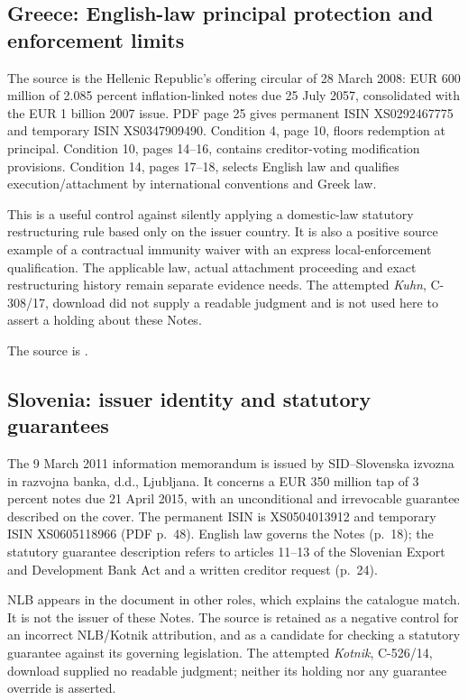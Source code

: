 \subsection{Greece: English-law principal protection and enforcement limits}

The source is the Hellenic Republic's offering circular of 28 March 2008:
EUR 600 million of 2.085 percent inflation-linked notes due 25 July 2057,
consolidated with the EUR 1 billion 2007 issue. PDF page 25 gives permanent
ISIN XS0292467775 and temporary ISIN XS0347909490. Condition 4, page 10,
floors redemption at principal. Condition 10, pages 14--16, contains
creditor-voting modification provisions. Condition 14, pages 17--18, selects
English law and qualifies execution/attachment by international conventions
and Greek law.

This is a useful control against silently applying a domestic-law statutory
restructuring rule based only on the issuer country. It is also a positive
source example of a contractual immunity waiver with an express
local-enforcement qualification. The applicable law, actual attachment
proceeding and exact restructuring history remain separate evidence needs.
The attempted \emph{Kuhn}, C-308/17, download did not supply a readable
judgment and is not used here to assert a holding about these Notes.

The source is
.

\subsection{Slovenia: issuer identity and statutory guarantees}

The 9 March 2011 information memorandum is issued by SID--Slovenska izvozna
in razvojna banka, d.d., Ljubljana. It concerns a EUR 350 million tap of
3 percent notes due 21 April 2015, with an unconditional and irrevocable
guarantee described on the cover. The permanent ISIN is XS0504013912 and
temporary ISIN XS0605118966 (PDF p.~48). English law governs the Notes
(p.~18); the statutory guarantee description refers to articles 11--13 of
the Slovenian Export and Development Bank Act and a written creditor
request (p.~24).

NLB appears in the document in other roles, which explains the catalogue
match. It is not the issuer of these Notes. The source is retained as a
negative control for an incorrect NLB/Kotnik attribution, and as a candidate
for checking a statutory guarantee against its governing legislation.
The attempted \emph{Kotnik}, C-526/14, download supplied no readable judgment;
neither its holding nor any guarantee override is asserted.

